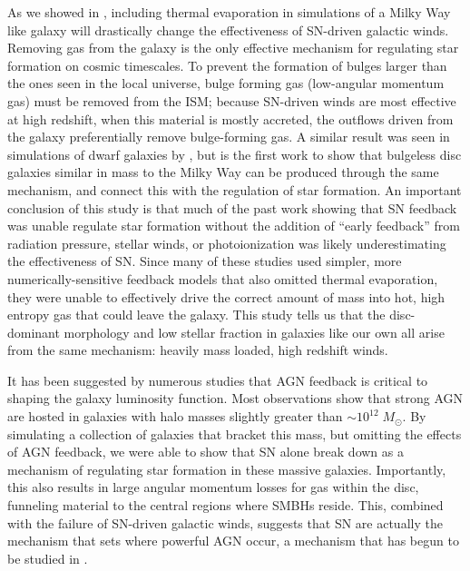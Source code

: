 As we showed in \citet{Keller2015}, including thermal evaporation in simulations
of a Milky Way like galaxy will drastically change the effectiveness of
SN-driven galactic winds.  Removing gas from the galaxy is the only effective
mechanism for regulating star formation on cosmic timescales.  To prevent the
formation of bulges larger than the ones seen in the local universe, bulge
forming gas (low-angular momentum gas) must be removed from the ISM; because
SN-driven winds are most effective at high redshift, when this material is
mostly accreted, the outflows driven from the galaxy preferentially remove
bulge-forming gas.  A similar result was seen in simulations of dwarf galaxies
by \citet{Brook2011}, but \citet{Keller2015} is the first work to show that
bulgeless disc galaxies similar in mass to the Milky Way can be produced through
the same mechanism, and connect this with the regulation of star formation.  An
important conclusion of this study is that much of the past work
\citet{Stinson2013,Agertz2013,Hopkins2014} showing that SN feedback was unable
regulate star formation without the addition of ``early feedback'' from
radiation pressure, stellar winds, or photoionization was likely underestimating
the effectiveness of SN.  Since many of these studies used simpler, more
numerically-sensitive feedback models that also omitted thermal evaporation,
they were unable to effectively drive the correct amount of mass into hot, high
entropy gas that could leave the galaxy.  This study tells us that the
disc-dominant morphology and low stellar fraction in galaxies like our own all
arise from the same mechanism:  heavily mass loaded, high redshift
winds.

It has been suggested by numerous studies \citep{Benson2003,Bower2006} that AGN
feedback is critical to shaping the galaxy luminosity function.  Most
observations \citep{Kauffmann2003b} show that strong AGN are hosted in galaxies
with halo masses slightly greater than $\sim10^{12}\;M_\odot$.  By simulating a
collection of galaxies that bracket this mass, but omitting the effects of AGN
feedback, we were able to show that SN alone break down as a mechanism of
regulating star formation in these massive galaxies.  Importantly, this also
results in large angular momentum losses for gas within the disc, funneling
material to the central regions where SMBHs reside.  This, combined with the
failure of SN-driven galactic winds, suggests that SN are actually the mechanism
that sets where powerful AGN occur, a mechanism that has begun to be studied in
\citet{Bower2016}.

